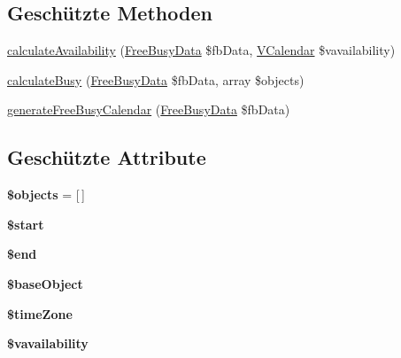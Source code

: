 \subsection*{Geschützte Methoden}
\begin{DoxyCompactItemize}
\item 
\mbox{\hyperlink{class_sabre_1_1_v_object_1_1_free_busy_generator_aee4f4df6e2531e0c0fd01f1fa6e047b9}{calculate\+Availability}} (\mbox{\hyperlink{class_sabre_1_1_v_object_1_1_free_busy_data}{Free\+Busy\+Data}} \$fb\+Data, \mbox{\hyperlink{class_sabre_1_1_v_object_1_1_component_1_1_v_calendar}{V\+Calendar}} \$vavailability)
\item 
\mbox{\hyperlink{class_sabre_1_1_v_object_1_1_free_busy_generator_a92310112ff215440bfa4c750439e0fd2}{calculate\+Busy}} (\mbox{\hyperlink{class_sabre_1_1_v_object_1_1_free_busy_data}{Free\+Busy\+Data}} \$fb\+Data, array \$objects)
\item 
\mbox{\hyperlink{class_sabre_1_1_v_object_1_1_free_busy_generator_a5ccd88d316f57290473b48425305afc6}{generate\+Free\+Busy\+Calendar}} (\mbox{\hyperlink{class_sabre_1_1_v_object_1_1_free_busy_data}{Free\+Busy\+Data}} \$fb\+Data)
\end{DoxyCompactItemize}
\subsection*{Geschützte Attribute}
\begin{DoxyCompactItemize}
\item 
\mbox{\label{class_sabre_1_1_v_object_1_1_free_busy_generator_a503441912882e5bcf49eef35d7acc4e6}} 
{\bfseries \$objects} = \mbox{[}$\,$\mbox{]}
\item 
\mbox{\label{class_sabre_1_1_v_object_1_1_free_busy_generator_a178671f814296bb12d434d01bee340db}} 
{\bfseries \$start}
\item 
\mbox{\label{class_sabre_1_1_v_object_1_1_free_busy_generator_abc63aab32799156064a842168b223539}} 
{\bfseries \$end}
\item 
\mbox{\label{class_sabre_1_1_v_object_1_1_free_busy_generator_ac00957b8894b090dc5cf7e41889a306e}} 
{\bfseries \$base\+Object}
\item 
\mbox{\label{class_sabre_1_1_v_object_1_1_free_busy_generator_aea1591f61e78befbf643a8e67e453f7c}} 
{\bfseries \$time\+Zone}
\item 
\mbox{\label{class_sabre_1_1_v_object_1_1_free_busy_generator_a4e1a9507463a3fa5aa7ab8f038f519b6}} 
{\bfseries \$vavailability}
\end{DoxyCompactItemize}


